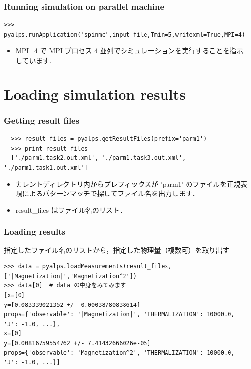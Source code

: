 \begin{frame}[t,fragile]
\frametitle{Running simulation on parallel machine}
\begin{lstlisting}
>>> pyalps.runApplication('spinmc',input_file,Tmin=5,writexml=True,MPI=4)
\end{lstlisting}
\begin{itemize}
\item MPI=4 で MPI プロセス 4 並列でシミュレーションを実行することを指示しています.
\end{itemize}

\end{frame}

\section{Loading simulation results}
\begin{frame}[t,fragile]
 \frametitle{Getting result files}
 \begin{lstlisting}
  >>> result_files = pyalps.getResultFiles(prefix='parm1')
  >>> print result_files
  ['./parm1.task2.out.xml', './parm1.task3.out.xml', './parm1.task1.out.xml']
 \end{lstlisting}
 \begin{itemize}
  \item カレントディレクトリ内からプレフィックスが 'parm1' のファイルを正規表現によるパターンマッチで探してファイル名を出力します．
  \item result\_files はファイル名のリスト．
 \end{itemize}
\end{frame}

\begin{frame}[t,fragile]
\frametitle{Loading results}
指定したファイル名のリストから，指定した物理量（複数可）を取り出す
\begin{lstlisting}
>>> data = pyalps.loadMeasurements(result_files,['|Magnetization|','Magnetization^2'])
>>> data[0]  # data の中身をみてみます
[x=[0]
y=[0.083339021352 +/- 0.00038780838614]
props={'observable': '|Magnetization|', 'THERMALIZATION': 10000.0, 'J': -1.0, ...}, 
x=[0]
y=[0.00816759554762 +/- 7.41432666026e-05]
props={'observable': 'Magnetization^2', 'THERMALIZATION': 10000.0, 'J': -1.0, ...}]
\end{lstlisting}
\end{frame}


